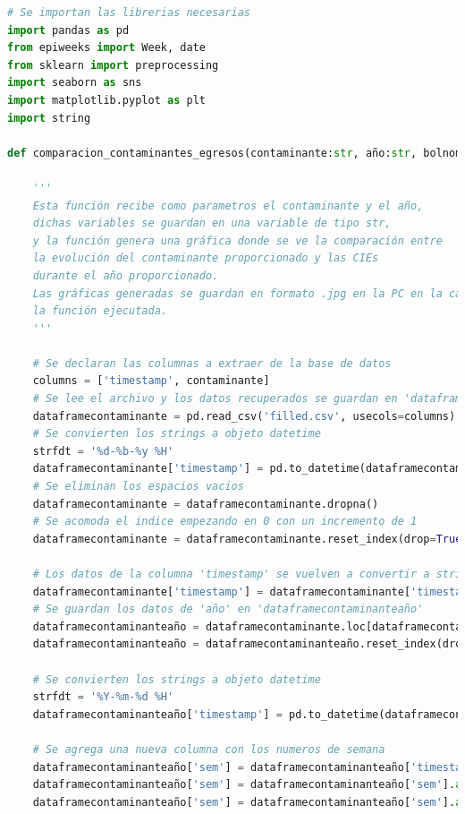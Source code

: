 \begin{lstlisting}[language=Python, caption=Procedimiento del segundo paso, label=lst:c1]
# Se importan las librerias necesarias
import pandas as pd
from epiweeks import Week, date
from sklearn import preprocessing
import seaborn as sns
import matplotlib.pyplot as plt
import string

def comparacion_contaminantes_egresos(contaminante:str, año:str, bolnombrescies:bool, nombrescies:list, numciesindividuales:int, numciesagrupadas:int) -> None:

    '''
    Esta función recibe como parametros el contaminante y el año,
    dichas variables se guardan en una variable de tipo str,
    y la función genera una gráfica donde se ve la comparación entre
    la evolución del contaminante proporcionado y las CIEs
    durante el año proporcionado.
    Las gráficas generadas se guardan en formato .jpg en la PC en la carpeta donde se encuentra
    la función ejecutada.
    '''

    # Se declaran las columnas a extraer de la base de datos
    columns = ['timestamp', contaminante]
    # Se lee el archivo y los datos recuperados se guardan en 'dataframecontaminante'
    dataframecontaminante = pd.read_csv('filled.csv', usecols=columns).dropna()
    # Se convierten los strings a objeto datetime
    strfdt = '%d-%b-%y %H'
    dataframecontaminante['timestamp'] = pd.to_datetime(dataframecontaminante['timestamp'], errors = 'coerce', format=strfdt)
    # Se eliminan los espacios vacios
    dataframecontaminante = dataframecontaminante.dropna()
    # Se acomoda el indice empezando en 0 con un incremento de 1
    dataframecontaminante = dataframecontaminante.reset_index(drop=True)
    
    # Los datos de la columna 'timestamp' se vuelven a convertir a strings
    dataframecontaminante['timestamp'] = dataframecontaminante['timestamp'].apply(lambda x: x.strftime('%Y-%m-%d %H'))
    # Se guardan los datos de 'año' en 'dataframecontaminanteaño'
    dataframecontaminanteaño = dataframecontaminante.loc[dataframecontaminante['timestamp'].str.startswith(año)]
    dataframecontaminanteaño = dataframecontaminanteaño.reset_index(drop=True)

    # Se convierten los strings a objeto datetime
    strfdt = '%Y-%m-%d %H'
    dataframecontaminanteaño['timestamp'] = pd.to_datetime(dataframecontaminanteaño['timestamp'], errors = 'coerce', format=strfdt)

    # Se agrega una nueva columna con los numeros de semana
    dataframecontaminanteaño['sem'] = dataframecontaminanteaño['timestamp'].apply(lambda x: date(x.year, x.month, x.day))
    dataframecontaminanteaño['sem'] = dataframecontaminanteaño['sem'].apply(lambda x: Week.fromdate(x))
    dataframecontaminanteaño['sem'] = dataframecontaminanteaño['sem'].apply(lambda x: x.week)


\end{lstlisting}
